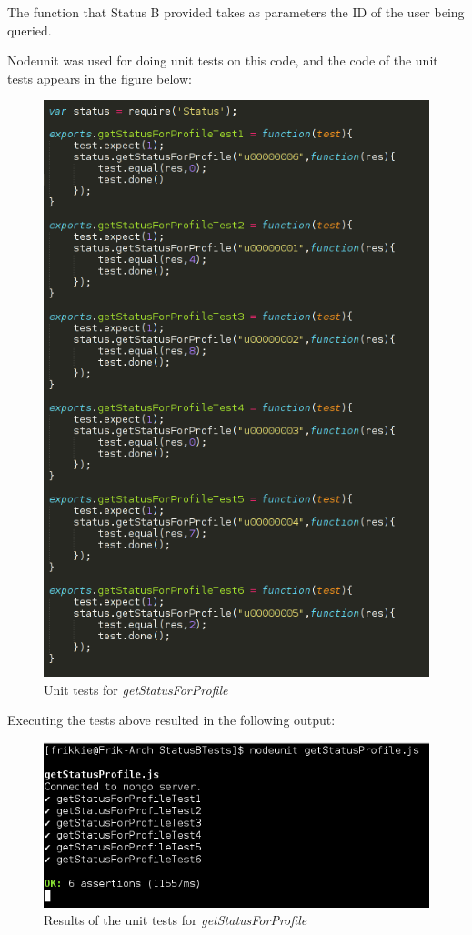 \documentclass[a4paper,12pt]{article}
\begin{document}
The function that Status B provided takes as parameters the ID of the user being queried.

Nodeunit was used for doing unit tests on this code, and the code of the unit tests appears in the figure below:

	\begin{figure}[H]
		\centering
		\includegraphics[width=1.0\textwidth]{Figures/getStatusForProfile_unittests.png}
		\caption{Unit tests for \textit{getStatusForProfile}}
	\end{figure}
	
Executing the tests above resulted in the following output:

	\begin{figure}[H]
		\centering
		\includegraphics[width=1.0\textwidth]{Figures/getStatusForProfile_results.png}
		\caption{Results of the unit tests for \textit{getStatusForProfile}}
	\end{figure}
	
\end{document}
